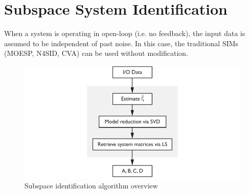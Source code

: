 \section{Subspace System Identification}
When a system is operating in open-loop (i.e. no feedback), the input data is assumed to be independent of past noise. In this case, the traditional SIMs (MOESP, N4SID, CVA) can be used without modification. 
\begin{figure}[htb!]
	\centering
	\includegraphics{../fig/sim_flow_diagram.pdf}
	\caption{Subspace identification algorithm overview}
\end{figure}


